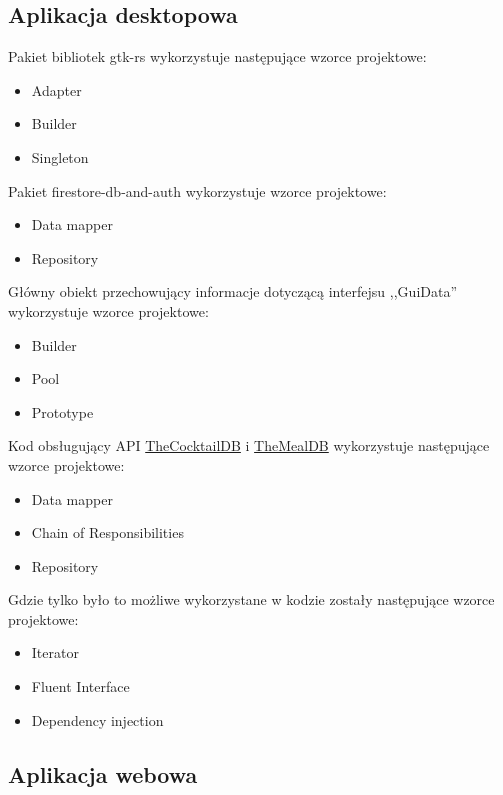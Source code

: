 \documentclass[12pt,a4paper]{article}
\begin{document}
		\subsection{Aplikacja desktopowa}

			\indent Pakiet bibliotek gtk-rs wykorzystuje następujące wzorce projektowe:
			\begin{itemize}
				\item Adapter
				\item Builder
				\item Singleton								 
			\end{itemize}

			\indent Pakiet firestore-db-and-auth wykorzystuje wzorce projektowe:
			\begin{itemize}
				\item Data mapper
				\item Repository
			\end{itemize}
			Główny obiekt przechowujący informacje dotyczącą interfejsu ,,GuiData'' wykorzystuje wzorce projektowe:
			\begin{itemize}
				\item Builder
				\item Pool
				\item Prototype
			\end{itemize}

			\indent Kod obsługujący API \href{https://www.thecocktaildb.com/api.php}{TheCocktailDB} i \href{https://www.themealdb.com/api.php}{TheMealDB}
			wykorzystuje następujące wzorce projektowe:
			\begin{itemize}
				\item Data mapper
				\item Chain of Responsibilities
				\item Repository
			\end{itemize}

			\indent Gdzie tylko było to możliwe wykorzystane w kodzie zostały następujące wzorce projektowe:
			\begin{itemize}
			\item Iterator
			\item Fluent Interface
			\item Dependency injection
			\end{itemize}			 

		\subsection{Aplikacja webowa}	 
	\newpage
	
\end{document}
